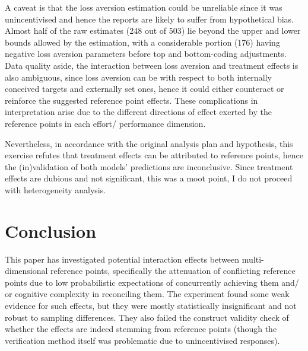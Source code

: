 \documentclass[12pt, letterpaper, DIV=11, numbers=noendperiod]{article}
\begin{document}
A caveat is that the loss aversion estimation could be unreliable since it was unincentivised and hence the reports are likely to suffer from hypothetical bias. Almost half of the raw estimates (248 out of 503) lie beyond the upper and lower bounds allowed by the estimation, with a considerable portion (176) having negative loss aversion parameters before top and bottom-coding adjustments. Data quality aside, the interaction between loss aversion and treatment effects is also ambiguous, since loss aversion can be with respect to both internally conceived targets and externally set ones, hence it could either counteract or reinforce the suggested reference point effects. These complications in interpretation arise due to the different directions of effect exerted by the reference points in each effort/ performance dimension.

Nevertheless, in accordance with the original analysis plan and hypothesis, this exercise refutes that treatment effects can be attributed to reference points, hence the (in)validation of both models' predictions are inconclusive. Since treatment effects are dubious and not significant, this was a moot point, I do not proceed with heterogeneity analysis.

\begin{table}
\centering

\caption{Treatment effects on target achievement interacted with loss aversion}\label{tbl-reg-target-la}
\end{table}

\begin{table}
\centering

\caption{Treatment effects on mistake rate interacted with loss aversion}\label{tbl-reg-mistakes-la}
\end{table}

\begin{table}
\centering

\caption{Treatment effects on sets completed interacted with loss aversion}\label{tbl-reg-sets-la}
\end{table}

\newpage

\section{Conclusion}\label{conclusion}

This paper has investigated potential interaction effects between multi-dimensional reference points, specifically the attenuation of conflicting reference points due to low probabilistic expectations of concurrently achieving them and/ or cognitive complexity in reconciling them. The experiment found some weak evidence for such effects, but they were mostly statistically insignificant and not robust to sampling differences. They also failed the construct validity check of whether the effects are indeed stemming from reference points (though the verification method itself was problematic due to unincentivised responses).
\end{document}

